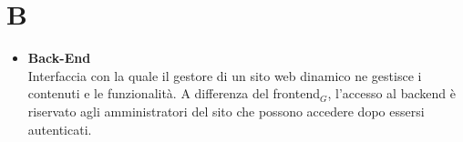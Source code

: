 \chapter{B} \label{B}
\begin{itemize}
	\item \textbf{Back-End} \\
	Interfaccia con la quale il gestore di un sito web dinamico ne gestisce i contenuti e le funzionalità. A differenza del frontend$_G$, l'accesso al backend è riservato agli amministratori del sito che possono accedere dopo essersi autenticati.
\end{itemize}